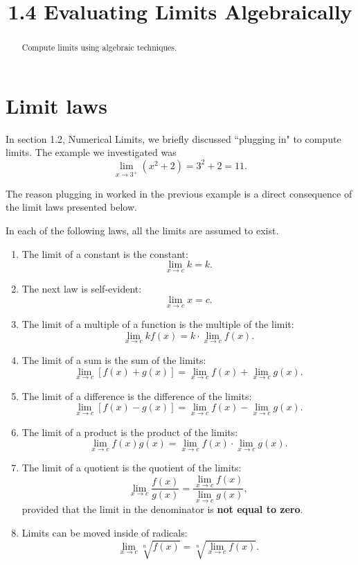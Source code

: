 \documentclass[handout]{ximera}
\title{1.4 Evaluating Limits Algebraically}
\begin{document}
\begin{abstract}
Compute limits using algebraic techniques.
\end{abstract}

\maketitle


\section{Limit laws}
 
In section 1.2, Numerical Limits, we briefly discussed ``plugging in" to compute limits.
 The example we investigated was
 \[
 \lim_{x \to 3^+} \left(x^2 + 2 \right) = 3^2 + 2 = 11.
 \]

The reason plugging in worked in the previous example is a direct consequence of the limit laws presented below.
 
In each of the following laws, all the limits are assumed to exist.

\begin{enumerate}

\item[1.]  
The limit of a constant is the constant:
 \[
 \lim_{x \to c} k = k.
 \]
 
\item[2.]
 The next law is self-evident:
 \[
 \lim_{x \to c} x = c.
 \]
 
 \item[3.]
 The limit of a multiple of a function is the multiple of the limit:
 \[
 \lim_{x \to c} kf(x) = k \cdot \lim_{x \to c} f(x). 
 \]
 
 \item[4.]
 The limit of a sum is the sum of the limits:
 \[
 \lim_{x \to c} \left[f(x) + g(x) \right] = \lim_{x \to c} f(x) + \lim_{x \to c} g(x). 
 \]
 
\item[5.]
 The limit of a difference is the difference of the limits:
 \[
 \lim_{x \to c} \left[f(x) - g(x) \right] = \lim_{x \to c} f(x) - \lim_{x \to c} g(x). 
 \]
 
\item[6.]
 The limit of a product is the product of the limits:
 \[
 \lim_{x \to c} f(x) g(x) = \lim_{x \to c} f(x) \cdot \lim_{x \to c} g(x). 
 \]


\item[7.]
 The limit of a quotient is the quotient of the limits:
 \[
 \lim_{x \to c} \frac{f(x)}{g(x)} = \dfrac{\lim_{x \to c} f(x)}{\lim_{x \to c} g(x)}, 
 \]
 provided that the limit in the denominator is \textbf{not equal to zero}.
 
 \item[8.]
 Limits can be moved inside of radicals:
 \[
 \lim_{x \to c} \sqrt[n]{f(x)} = \sqrt[n]{\lim_{x \to c} f(x)}. 
 \]

\end{enumerate}
\end{document}
